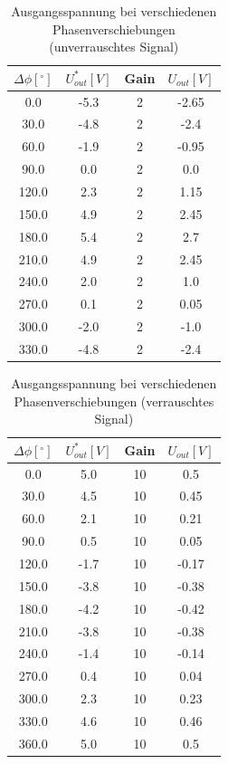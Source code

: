 \documentclass[11pt]{article}
\begin{document}
\begin{table}[h!]
\centering
\begin{tabular}{|c|c|c|c|}
\hline
$\Delta \phi [^\circ]$ & $U_{out}^* [V]$ & Gain & $U_{out} [V]$ \\
\hline
0.0 & -5.3 & 2 & -2.65\\
30.0 & -4.8 & 2 &-2.4\\
60.0 & -1.9 & 2 &-0.95\\
90.0 & 0.0 & 2 &0.0\\
120.0 & 2.3 & 2 &1.15\\
150.0 & 4.9 & 2 &2.45\\
180.0 & 5.4 & 2 &2.7\\
210.0 & 4.9 & 2 &2.45\\
240.0 & 2.0 & 2 &1.0\\
270.0 & 0.1 & 2 &0.05\\
300.0 & -2.0 & 2 &-1.0\\
330.0 & -4.8 & 2 &-2.4\\
\hline
\end{tabular}
\label{data1}
\caption{Ausgangsspannung bei verschiedenen Phasenverschiebungen \newline (unverrauschtes Signal)}
\end{table}


\begin{table}[h!]
\centering
\begin{tabular}{|c|c|c|c|}
\hline
$\Delta \phi [^\circ]$ & $U_{out}^* [V]$ & Gain & $U_{out} [V]$ \\
\hline
0.0 & 5.0 & 10 & 0.5\\
30.0 & 4.5 & 10 & 0.45\\
60.0 & 2.1 & 10 & 0.21\\
90.0 & 0.5 & 10 & 0.05\\
120.0 & -1.7 & 10 & -0.17\\
150.0 & -3.8 & 10 & -0.38\\
180.0 & -4.2 & 10 & -0.42\\
210.0 & -3.8 & 10 & -0.38\\
240.0 & -1.4 & 10 & -0.14\\
270.0 & 0.4 & 10 & 0.04\\
300.0 & 2.3 & 10 & 0.23\\
330.0 & 4.6 & 10 & 0.46\\
360.0 & 5.0 & 10 & 0.5\\
\hline
\end{tabular}
\label{data2}
\caption{Ausgangsspannung bei verschiedenen Phasenverschiebungen \newline (verrauschtes Signal)}
\end{table}
\end{document}
